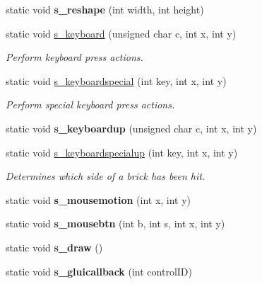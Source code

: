 \begin{DoxyCompactItemize}
\item 
\hypertarget{classBaseGfxApp_a5fe6a77d37044cbe28647ed3391bbb7a}{static void {\bfseries s\-\_\-reshape} (int width, int height)}\label{classBaseGfxApp_a5fe6a77d37044cbe28647ed3391bbb7a}

\item 
static void \hyperlink{classBaseGfxApp_a52edb2569227319feb68779844e7d857}{s\-\_\-keyboard} (unsigned char c, int x, int y)
\begin{DoxyCompactList}\small\item\em Perform keyboard press actions. \end{DoxyCompactList}\item 
static void \hyperlink{classBaseGfxApp_a1e8d90a4faab60300ddf2a4ea9b83115}{s\-\_\-keyboardspecial} (int key, int x, int y)
\begin{DoxyCompactList}\small\item\em Perform special keyboard press actions. \end{DoxyCompactList}\item 
\hypertarget{classBaseGfxApp_aa1ca205af9d6cee33949f2e6adf4c923}{static void {\bfseries s\-\_\-keyboardup} (unsigned char c, int x, int y)}\label{classBaseGfxApp_aa1ca205af9d6cee33949f2e6adf4c923}

\item 
static void \hyperlink{classBaseGfxApp_a0e4dfe006f3cc9126c1cc8ad32784f75}{s\-\_\-keyboardspecialup} (int key, int x, int y)
\begin{DoxyCompactList}\small\item\em Determines which side of a brick has been hit. \end{DoxyCompactList}\item 
\hypertarget{classBaseGfxApp_a5e640f2394f7e038d0dd2b469d5c2e24}{static void {\bfseries s\-\_\-mousemotion} (int x, int y)}\label{classBaseGfxApp_a5e640f2394f7e038d0dd2b469d5c2e24}

\item 
\hypertarget{classBaseGfxApp_a22dd953bfb75add9fd0f8f2f8be535c5}{static void {\bfseries s\-\_\-mousebtn} (int b, int s, int x, int y)}\label{classBaseGfxApp_a22dd953bfb75add9fd0f8f2f8be535c5}

\item 
\hypertarget{classBaseGfxApp_a58415c6151a2a80e1fe2eaa9919a4dab}{static void {\bfseries s\-\_\-draw} ()}\label{classBaseGfxApp_a58415c6151a2a80e1fe2eaa9919a4dab}

\item 
\hypertarget{classBaseGfxApp_ad4a963321f1147d68369225ab0c7f32f}{static void {\bfseries s\-\_\-gluicallback} (int control\-I\-D)}\label{classBaseGfxApp_ad4a963321f1147d68369225ab0c7f32f}

\end{DoxyCompactItemize}
